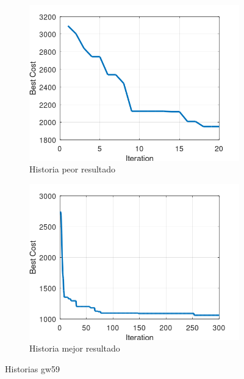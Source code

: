 \documentclass[12pt, a4paper]{article}
\begin{document}
\begin{figure}[H]
    \centering
    \begin{subfigure}[b]{0.45\textwidth}
        \centering
        \includegraphics[width=\textwidth]{img/gw59-worst-history.png}
        \caption{Historia peor resultado}
        \label{fig:gw59-worst-history}
    \end{subfigure}
    \hfill
    \begin{subfigure}[b]{0.45\textwidth}
        \centering
        \includegraphics[width=\textwidth]{img/gw59-best-history.png}
        \caption{Historia mejor resultado}
        \label{fig:gw59-best-history}
    \end{subfigure}
    \caption{Historias gw59}
    \label{fig:gw59-histories}
\end{figure}
\end{document}
